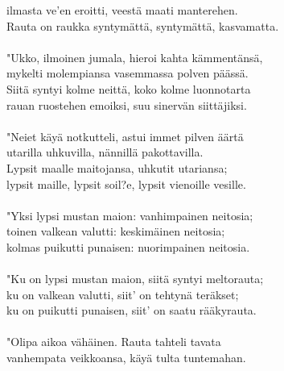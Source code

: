 ilmasta ve'en eroitti, veestä maati manterehen.                        \\
Rauta on raukka syntymättä, syntymättä, kasvamatta.                    \\
                                                                       \\
"Ukko, ilmoinen jumala, hieroi kahta kämmentänsä,                      \\
mykelti molempiansa vasemmassa polven päässä.                          \\
Siitä syntyi kolme neittä, koko kolme luonnotarta                      \\
rauan ruostehen emoiksi, suu sinervän siittäjiksi.                     \\
                                                                       \\
"Neiet käyä notkutteli, astui immet pilven äärtä                       \\
utarilla uhkuvilla, nännillä pakottavilla.                             \\
Lypsit maalle maitojansa, uhkutit utariansa;                           \\
lypsit maille, lypsit soil?e, lypsit vienoille vesille.                \\
                                                                       \\
"Yksi lypsi mustan maion: vanhimpainen neitosia;                       \\
toinen valkean valutti: keskimäinen neitosia;                          \\
kolmas puikutti punaisen: nuorimpainen neitosia.                       \\
                                                                       \\
"Ku on lypsi mustan maion, siitä syntyi meltorauta;                    \\
ku on valkean valutti, siit' on tehtynä teräkset;                      \\
ku on puikutti punaisen, siit' on saatu rääkyrauta.                    \\
                                                                       \\
"Olipa aikoa vähäinen. Rauta tahteli tavata                            \\
vanhempata veikkoansa, käyä tulta tuntemahan.                          \\
